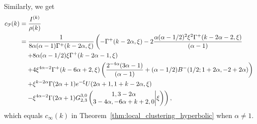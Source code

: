 Similarly, we get
\begin{align*}
	c_\Pcal(k) &= \frac{I^{(k)}}{\rho(k)} \\
	&=\frac{1}{8\alpha (\alpha-1)\Gamma^+(k-2\alpha,\xi)} \left( -\Gamma^+(k - 2 \alpha, \xi) 
		- 2\frac{\alpha (\alpha - 1/2)^2 \xi^{2} \Gamma^+(k - 2 \alpha - 2, \xi)}{(\alpha - 1)} \right. \\ 
	&\hspace{10pt}\left.+ 8 \alpha (\alpha - 1/2) \xi \Gamma^+(k - 2 \alpha - 1,\xi) \right.\\ 
	&\hspace{10pt}\left.+ 4\xi^{4\alpha - 2} \Gamma^+(k - 6 \alpha + 2, 
      \xi) \left( \frac{2^{ - 4\alpha}(3 \alpha - 1)}{(\alpha - 1)} + (\alpha - 1/2) B^-(1/2; 1 + 2 \alpha, -2 + 2 \alpha) \right)  \right.\\ 
	&\hspace{10pt}\left.+ \xi^{k-2\alpha} \Gamma(2\alpha+1)e^{-\xi} U(2\alpha+1,1+k-2\alpha,\xi) \right. \\ 
	&\hspace{10pt}\left.- \xi^{4\alpha-2} \Gamma(2\alpha+1)\MeijerG{3}{0}{2}{3}{1,3-2\alpha}{3-4\alpha,-6\alpha+k+2,0}{\xi}  \right),
\end{align*}
which equals $c_\infty(k)$ in Theorem~\ref{thm:local_clustering_hyperbolic} when $\alpha \ne 1$.


